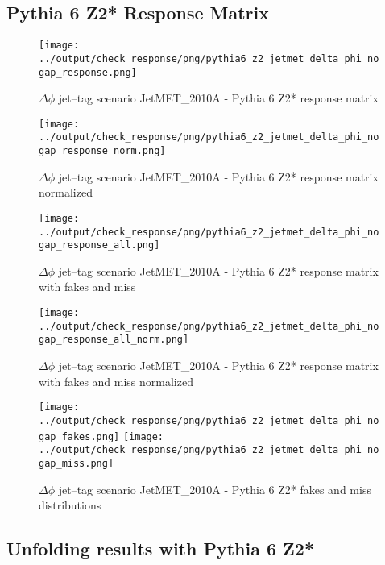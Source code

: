 \documentclass[11pt]{book}
\begin{document}
\subsection{Pythia 6 Z2* Response Matrix}

\begin{figure}[ht]
\centering
\texttt{[image: ../output/check\_response/png/pythia6\_z2\_jetmet\_delta\_phi\_nogap\_response.png]}
\caption{$\Delta\phi$ jet--tag scenario JetMET\_2010A - Pythia 6 Z2* response matrix}
\label{p6_jetmet_delta_phi_nogap_response}
\end{figure}

\begin{figure}[ht]
\centering
\texttt{[image: ../output/check\_response/png/pythia6\_z2\_jetmet\_delta\_phi\_nogap\_response\_norm.png]}
\caption{$\Delta\phi$ jet--tag scenario JetMET\_2010A - Pythia 6 Z2* response matrix normalized}
\label{p6_jetmet_delta_phi_nogap_response_norm}
\end{figure}

\begin{figure}[ht]
\centering
\texttt{[image: ../output/check\_response/png/pythia6\_z2\_jetmet\_delta\_phi\_nogap\_response\_all.png]}
\caption{$\Delta\phi$ jet--tag scenario JetMET\_2010A - Pythia 6 Z2* response matrix with fakes and miss}
\label{p6_jetmet_delta_phi_nogap_response_all}
\end{figure}

\begin{figure}[ht]
\centering
\texttt{[image: ../output/check\_response/png/pythia6\_z2\_jetmet\_delta\_phi\_nogap\_response\_all\_norm.png]}
\caption{$\Delta\phi$ jet--tag scenario JetMET\_2010A - Pythia 6 Z2* response matrix with fakes and miss normalized}
\label{p6_jetmet_delta_phi_nogap_response_all_norm}
\end{figure}

\begin{figure}[ht]
\centering
\texttt{[image: ../output/check\_response/png/pythia6\_z2\_jetmet\_delta\_phi\_nogap\_fakes.png]}
\texttt{[image: ../output/check\_response/png/pythia6\_z2\_jetmet\_delta\_phi\_nogap\_miss.png]}
\caption{$\Delta\phi$ jet--tag scenario JetMET\_2010A - Pythia 6 Z2* fakes and miss distributions}
\label{p6_jetmet_delta_phi_nogap_fakesmiss}
\end{figure}


\clearpage
\subsection{Unfolding results with Pythia 6 Z2*}
\end{document}
